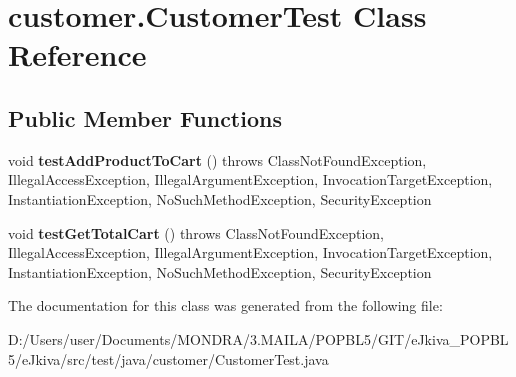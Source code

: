 \hypertarget{classcustomer_1_1_customer_test}{}\section{customer.\+Customer\+Test Class Reference}
\label{classcustomer_1_1_customer_test}
\subsection*{Public Member Functions}
\begin{DoxyCompactItemize}
\item 
\mbox{\label{classcustomer_1_1_customer_test_a2ce424afac93fabc7c82d408c6238ca1}} 
void {\bfseries test\+Add\+Product\+To\+Cart} ()  throws Class\+Not\+Found\+Exception,     Illegal\+Access\+Exception, Illegal\+Argument\+Exception,     Invocation\+Target\+Exception, Instantiation\+Exception,     No\+Such\+Method\+Exception, Security\+Exception 
\item 
\mbox{\label{classcustomer_1_1_customer_test_aae68c9c91ef02d38887c7b7a1d3f88cc}} 
void {\bfseries test\+Get\+Total\+Cart} ()  throws Class\+Not\+Found\+Exception,     Illegal\+Access\+Exception, Illegal\+Argument\+Exception,     Invocation\+Target\+Exception, Instantiation\+Exception,     No\+Such\+Method\+Exception, Security\+Exception 
\end{DoxyCompactItemize}


The documentation for this class was generated from the following file\+:\begin{DoxyCompactItemize}
\item 
D\+:/\+Users/user/\+Documents/\+M\+O\+N\+D\+R\+A/3.\+M\+A\+I\+L\+A/\+P\+O\+P\+B\+L5/\+G\+I\+T/e\+Jkiva\+\_\+\+P\+O\+P\+B\+L5/e\+Jkiva/src/test/java/customer/Customer\+Test.\+java\end{DoxyCompactItemize}
